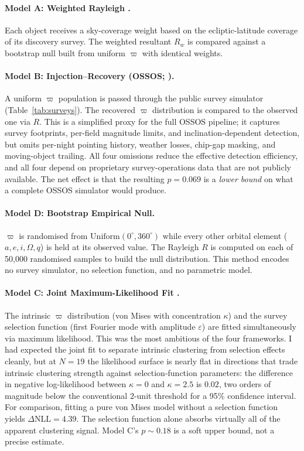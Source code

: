 \documentclass{aa}
\begin{document}
\paragraph{Model A: Weighted Rayleigh \protect\citep{brown2019}.}
Each object receives a sky-coverage weight based on the ecliptic-latitude coverage of its discovery survey. The weighted resultant $R_w$ is compared against a bootstrap null built from uniform $\varpi$ with identical weights.

\paragraph{Model B: Injection--Recovery (OSSOS; \protect\citealt{shankman2017}).}
A uniform $\varpi$ population is passed through the public survey simulator (Table~\ref{tab:surveys}). The recovered $\varpi$ distribution is compared to the observed one via $R$. This is a simplified proxy for the full OSSOS pipeline; it captures survey footprints, per-field magnitude limits, and inclination-dependent detection, but omits per-night pointing history, weather losses, chip-gap masking, and moving-object trailing. All four omissions reduce the effective detection efficiency, and all four depend on proprietary survey-operations data that are not publicly available. The net effect is that the resulting $p=0.069$ is a \textit{lower bound} on what a complete OSSOS simulator would produce.

\paragraph{Model D: Bootstrap Empirical Null.}
$\varpi$ is randomised from $\mathrm{Uniform}(0^\circ, 360^\circ)$ while every other orbital element ($a, e, i, \Omega, q$) is held at its observed value. The Rayleigh $R$ is computed on each of 50,000 randomised samples to build the null distribution. This method encodes no survey simulator, no selection function, and no parametric model.

\paragraph{Model C: Joint Maximum-Likelihood Fit \protect\citep{napier2021}.}
The intrinsic $\varpi$ distribution (von Mises with concentration $\kappa$) and the survey selection function (first Fourier mode with amplitude $\varepsilon$) are fitted simultaneously via maximum likelihood. This was the most ambitious of the four frameworks. I had expected the joint fit to separate intrinsic clustering from selection effects cleanly, but at $N=19$ the likelihood surface is nearly flat in directions that trade intrinsic clustering strength against selection-function parameters: the difference in negative log-likelihood between $\kappa=0$ and $\kappa=2.5$ is $0.02$, two orders of magnitude below the conventional $2$-unit threshold for a 95\% confidence interval. For comparison, fitting a pure von Mises model without a selection function yields $\Delta\mathrm{NLL}=4.39$. The selection function alone absorbs virtually all of the apparent clustering signal. Model C's $p\sim0.18$ is a soft upper bound, not a precise estimate.
\end{document}
